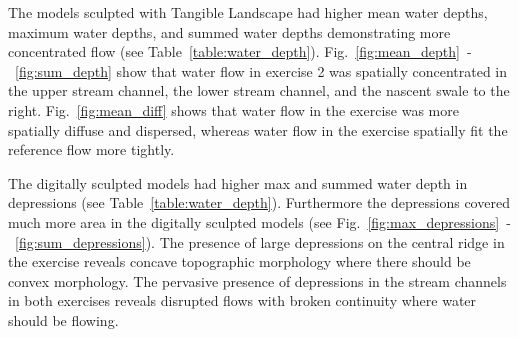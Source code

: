\documentclass{isprs}
\begin{document}
The models sculpted with Tangible Landscape had higher 
mean water depths, 
maximum water depths, and 
summed water depths
demonstrating more concentrated flow
(see Table~\ref{table:water_depth}).
%
Fig.~\ref{fig:mean_depth}~-~\ref{fig:sum_depth} 
show that water flow in exercise 2 was
spatially concentrated 
in the upper stream channel, 
the lower stream channel, 
and the nascent swale to the right.
%
%
Fig.~\ref{fig:mean_diff} 
shows that water flow in the  exercise was more spatially diffuse and dispersed, 
whereas water flow in the  exercise spatially fit the reference flow more tightly.

The digitally sculpted models had higher max and summed 
water depth in depressions (see Table~\ref{table:water_depth}).
Furthermore the depressions covered much more area in the digitally sculpted models
(see Fig.~\ref{fig:max_depressions}~-~\ref{fig:sum_depressions}).
%
The presence of large depressions on the central ridge in the  exercise reveals 
concave topographic morphology where there should be convex morphology.
%
The pervasive presence of depressions in the stream channels in both exercises 
reveals disrupted flows with broken continuity where water should be flowing. 
\end{document}

